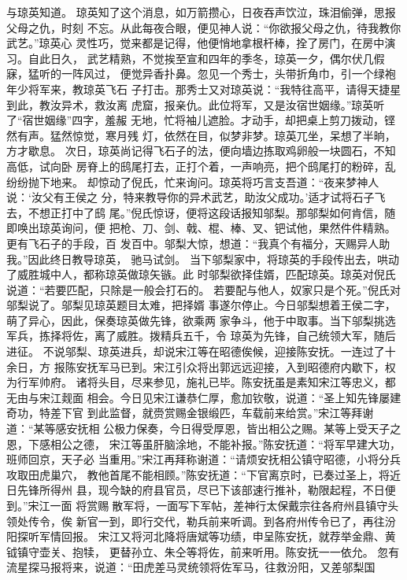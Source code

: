 与琼英知道。
琼英知了这个消息，如万箭攒心，日夜吞声饮泣，珠泪偷弹，思报父母之仇，时刻
不忘。从此每夜合眼，便见神人说：“你欲报父母之仇，待我教你武艺。”琼英心
灵性巧，觉来都是记得，他便悄地拿根杆棒，拴了房门，在房中演习。自此日久，
武艺精熟，不觉挨至宣和四年的季冬，琼英一夕，偶尔伏几假寐，猛听的一阵风过，
便觉异香扑鼻。忽见一个秀士，头带折角巾，引一个绿袍年少将军来，教琼英飞石
子打击。那秀士又对琼英说：“我特往高平，请得天捷星到此，教汝异术，救汝离
虎窟，报亲仇。此位将军，又是汝宿世姻缘。”琼英听了“宿世姻缘”四字，羞赧
无地，忙将袖儿遮脸。才动手，却把桌上剪刀拨动，铿然有声。猛然惊觉，寒月残
灯，依然在目，似梦非梦。琼英兀坐，呆想了半晌，方才歇息。
次日，琼英尚记得飞石子的法，便向墙边拣取鸡卵般一块圆石，不知高低，试向卧
房脊上的鸱尾打去，正打个着，一声响亮，把个鸱尾打的粉碎，乱纷纷抛下地来。
却惊动了倪氏，忙来询问。琼英将巧言支吾道：“夜来梦神人说：‘汝父有王侯之
分，特来教导你的异术武艺，助汝父成功。’适才试将石子飞去，不想正打中了鸱
尾。”倪氏惊讶，便将这段话报知邬梨。那邬梨如何肯信，随即唤出琼英询问，便
把枪、刀、剑、戟、棍、棒、叉、钯试他，果然件件精熟。更有飞石子的手段，百
发百中。邬梨大惊，想道：“我真个有福分，天赐异人助我。”因此终日教导琼英，
驰马试剑。
当下邬梨家中，将琼英的手段传出去，哄动了威胜城中人，都称琼英做琼矢镞。此
时邬梨欲择佳婿，匹配琼英。琼英对倪氏说道：“若要匹配，只除是一般会打石的。
若要配与他人，奴家只是个死。”倪氏对邬梨说了。邬梨见琼英题目太难，把择婿
事遂尔停止。今日邬梨想着王侯二字，萌了异心，因此，保奏琼英做先锋，欲乘两
家争斗，他于中取事。当下邬梨挑选军兵，拣择将佐，离了威胜。拨精兵五千，令
琼英为先锋，自己统领大军，随后进征。
不说邬梨、琼英进兵，却说宋江等在昭德俟候，迎接陈安抚。一连过了十余日，方
报陈安抚军马已到。宋江引众将出郭远远迎接，入到昭德府内歇下，权为行军帅府。
诸将头目，尽来参见，施礼已毕。陈安抚虽是素知宋江等忠义，都无由与宋江觌面
相会。今日见宋江谦恭仁厚，愈加钦敬，说道：“圣上知先锋屡建奇功，特差下官
到此监督，就赍赏赐金银缎匹，车载前来给赏。”宋江等拜谢道：“某等感安抚相
公极力保奏，今日得受厚恩，皆出相公之赐。某等上受天子之恩，下感相公之德，
宋江等虽肝脑涂地，不能补报。”陈安抚道：“将军早建大功，班师回京，天子必
当重用。”宋江再拜称谢道：“请烦安抚相公镇守昭德，小将分兵攻取田虎巢穴，
教他首尾不能相顾。”陈安抚道：“下官离京时，已奏过圣上，将近日先锋所得州
县，现今缺的府县官员，尽已下该部速行推补，勒限起程，不日便到。”宋江一面
将赏赐散军将，一面写下军帖，差神行太保戴宗往各府州县镇守头领处传令，俟
新官一到，即行交代，勒兵前来听调。到各府州传令已了，再往汾阳探听军情回报。
宋江又将河北降将唐斌等功绩，申呈陈安抚，就荐举金鼎、黄钺镇守壶关、抱犊，
更替孙立、朱仝等将佐，前来听用。陈安抚一一依允。
忽有流星探马报将来，说道：“田虎差马灵统领将佐军马，往救汾阳，又差邬梨国
